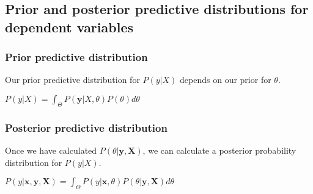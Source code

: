 
\subsection{Prior and posterior predictive distributions for dependent variables}

\subsubsection{Prior predictive distribution}

Our prior predictive distribution for \(P(y|X)\) depends on our prior for \(\theta \).

\(P(y|X)=\int_\Theta P(\mathbf y|X, \theta)P(\theta )d\theta \)

\subsubsection{Posterior predictive distribution}

Once we have calculated \(P(\theta |\mathbf y, \mathbf X)\), we can calculate a posterior probability distribution for \(P(y|X)\).

\(P(y|\mathbf x, \mathbf y,  \mathbf X )=\int_\Theta P(y|\mathbf x, \theta)P(\theta |\mathbf y, \mathbf X)d\theta \)

